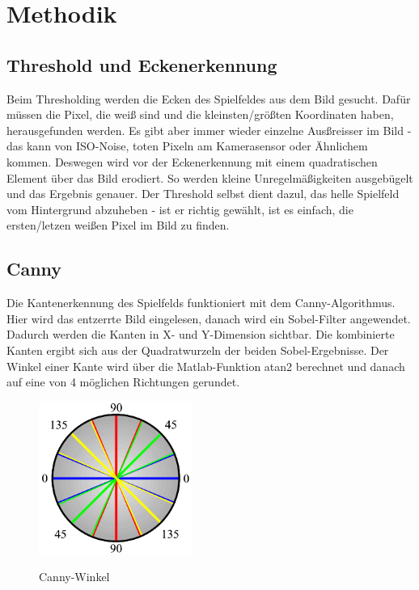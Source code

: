 \documentclass[paper=A4, deutsch]{scrartcl}
\begin{document}

\section{Methodik}

\subsection{Threshold und Eckenerkennung}
Beim Thresholding werden die Ecken des Spielfeldes aus dem Bild gesucht. Dafür müssen die Pixel, die weiß sind und die kleinsten/größten Koordinaten haben, herausgefunden werden. Es gibt aber immer wieder einzelne Ausßreisser im Bild - das kann von ISO-Noise, toten Pixeln am Kamerasensor oder Ähnlichem kommen. Deswegen wird vor der Eckenerkennung mit einem quadratischen Element über das Bild erodiert. So werden kleine Unregelmäßigkeiten ausgebügelt und das Ergebnis genauer. Der Threshold selbst dient dazul, das helle Spielfeld vom Hintergrund abzuheben - ist er richtig gewählt, ist es einfach, die ersten/letzen weißen Pixel im Bild zu finden.

\subsection{Canny}
Die Kantenerkennung des Spielfelds funktioniert mit dem Canny-Algorithmus. Hier wird das entzerrte Bild eingelesen, danach wird ein Sobel-Filter angewendet. Dadurch werden die Kanten in X- und Y-Dimension sichtbar. Die kombinierte Kanten ergibt sich aus der Quadratwurzeln der beiden Sobel-Ergebnisse. Der Winkel einer Kante wird über die Matlab-Funktion atan2 berechnet und danach auf eine von 4 möglichen Richtungen gerundet. \\

\begin{figure}[ht]
	\centering
		\includegraphics[width=5cm]{CannyEdgeWheel.png}\\
	\caption[Canny-Winkel]{Canny-Winkel}
	\label{fig:nettop}
\end{figure}
\end{document}
